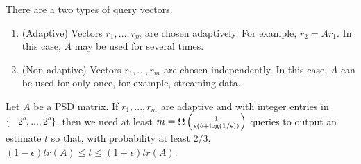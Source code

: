 \documentclass[10pt]{book}
\begin{document}
There are a two types of query vectors.
\begin{enumerate}
    \item (Adaptive) Vectors $r_1,...,r_m$ are chosen adaptively. For example, $r_2=Ar_1$. In this case, $A$ may be used for several times.
    \item (Non-adaptive) Vectors $r_1,...,r_m$ are chosen independently. In this case, $A$ can be used for only once, for example, streaming data.
\end{enumerate}

\begin{thm}
\label{tr_est_ada}
    Let $A$ be a PSD matrix. If $r_1,...,r_m$ are adaptive and with integer entries in $\{-2^b,...,2^b\}$, then we need at least $m=\Omega\left(\frac{1}{\epsilon(b+\log(1/\epsilon))}\right)$ queries to output an estimate $t$ so that, with probability at least $2/3$, $(1-\epsilon)tr(A)\le t\le (1+\epsilon)tr(A)$.
\end{thm}
\end{document}
